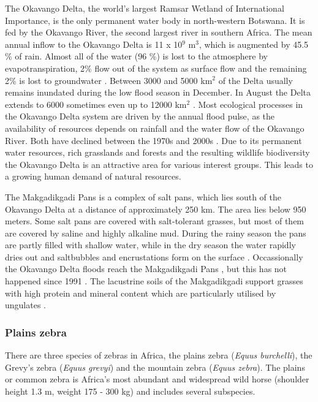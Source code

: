 \documentclass[12pt,a4paper, twoside, english]{article}
\begin{document}
The Okavango Delta, the world's largest Ramsar Wetland of International Importance, is the only permanent water body in north-western Botswana. It is fed by the Okavango River, the second largest river in southern Africa. The mean annual inflow to the Okavango Delta is 11 x 10$^{9}$ m$^{3}$, which is augmented by 45.5 \% of rain. Almost all of the water (96 \%) is lost to the atmosphere by evapotranspiration, 2\% flow out of the system as surface flow and the remaining 2\% is lost to groundwater \citep{Ellery1998}. Between 3000 and 5000 km$^{2}$ of the Delta usually remains inundated during the low flood season in December. In August the Delta extends to 6000 sometimes even up to 12000 km$^{2}$ \citep{Kgathi2014}. Most ecological processes in the Okavango Delta system are driven by the annual flood pulse, as the availability of resources depends on rainfall and the water flow of the Okavango River. Both have declined between the 1970s and 2000s \citep{Kgathi2014}. Due to its permanent water resources, rich grasslands and forests and the resulting wildlife biodiversity the Okavango Delta is an attractive area for various interest groups. This leads to a growing human demand of natural resources.

The Makgadikgadi Pans is a complex of salt pans, which lies south of the Okavango Delta at a distance of approximately 250 km. The area lies below 950 meters. Some salt pans are covered with salt-tolerant grasses, but most of them are covered by saline and highly alkaline mud. During the rainy season the pans are partly filled with shallow water, while in the dry season the water rapidly dries out and saltbubbles and encrustations form on the surface \citep{Cooke1979}. Occassionally the Okavango Delta floods reach the Makgadikgadi Pans \citep{Varis2008}, but this has not happened since 1991 \citep{White2006}. The lacustrine soils of the Makgadikgadi support grasses with high protein and mineral content which are particularly utilised by ungulates \citep{Baillieul1979}.

\subsubsection{Plains zebra}

There are three species of zebras in Africa, the plains zebra (\textit{Equus burchelli}), the Grevy's zebra (\textit{Equus grevyi}) and the mountain zebra (\textit{Equus zebra}). The plains or common zebra is Africa's most abundant and widespread wild horse (shoulder height 1.3 m, weight 175 - 300 kg) and includes several subspecies.
\end{document}
